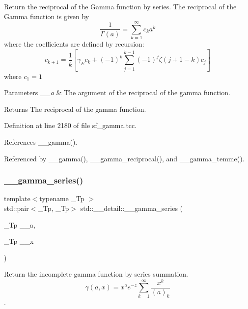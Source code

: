 Return the reciprocal of the Gamma function by series. The reciprocal of the Gamma function is given by \[ \frac{1}{\Gamma(a)} = \sum_{k=1}^{\infty} c_k a^k \] where the coefficients are defined by recursion\+: \[ c_{k+1} = \frac{1}{k}\left[\gamma_E c_k + (-1)^k\sum_{j=1}^{k-1}(-1)^j\zeta(j+1-k)c_j\right] \] where $ c_1 = 1 $


\begin{DoxyParams}{Parameters}
{\em \+\_\+\+\_\+a} & The argument of the reciprocal of the gamma function. \\
\hline
\end{DoxyParams}
\begin{DoxyReturn}{Returns}
The reciprocal of the gamma function. 
\end{DoxyReturn}


Definition at line 2180 of file sf\+\_\+gamma.\+tcc.



References \+\_\+\+\_\+gamma().



Referenced by \+\_\+\+\_\+gamma(), \+\_\+\+\_\+gamma\+\_\+reciprocal(), and \+\_\+\+\_\+gamma\+\_\+temme().

\mbox{\label{namespacestd_1_1____detail_aa480c595e1c5b894d76398cf0e8eb02b}} 
\subsubsection{\texorpdfstring{\+\_\+\+\_\+gamma\+\_\+series()}{\_\_gamma\_series()}}
{\footnotesize\ttfamily template$<$typename \+\_\+\+Tp $>$ \\
std\+::pair$<$\+\_\+\+Tp, \+\_\+\+Tp$>$ std\+::\+\_\+\+\_\+detail\+::\+\_\+\+\_\+gamma\+\_\+series (\begin{DoxyParamCaption}\item[{\+\_\+\+Tp}]{\+\_\+\+\_\+a,  }\item[{\+\_\+\+Tp}]{\+\_\+\+\_\+x }\end{DoxyParamCaption})}



Return the incomplete gamma function by series summation. \[ \gamma(a,x) = x^a e^{-z}\sum_{k=1}^{\infty} \frac{x^k}{(a)_k} \]. 



